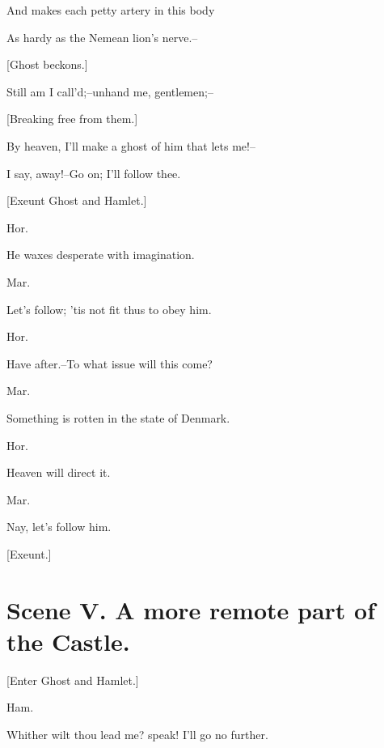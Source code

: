 \documentclass[12pt]{book}
\begin{document}
And makes each petty artery in this body

As hardy as the Nemean lion's nerve.--



[Ghost beckons.]



Still am I call'd;--unhand me, gentlemen;--



[Breaking free from them.]



By heaven, I'll make a ghost of him that lets me!--

I say, away!--Go on; I'll follow thee.



[Exeunt Ghost and Hamlet.]



Hor.

He waxes desperate with imagination.



Mar.

Let's follow; 'tis not fit thus to obey him.



Hor.

Have after.--To what issue will this come?



Mar.

Something is rotten in the state of Denmark.



Hor.

Heaven will direct it.



Mar.

Nay, let's follow him.



[Exeunt.]







\section*{Scene V. A more remote part of the Castle.}



[Enter Ghost and Hamlet.]



Ham.

Whither wilt thou lead me? speak! I'll go no further.
\end{document}
